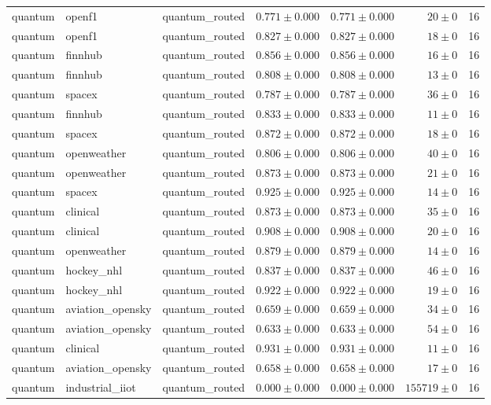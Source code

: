 \begin{table}[htbp]
\begin{tabular}{l l l r r r r}
quantum & openf1 & quantum\_routed & $0.771\pm0.000$ & $0.771\pm0.000$ & $20\pm0$ & 16 \\
quantum & openf1 & quantum\_routed & $0.827\pm0.000$ & $0.827\pm0.000$ & $18\pm0$ & 16 \\
quantum & finnhub & quantum\_routed & $0.856\pm0.000$ & $0.856\pm0.000$ & $16\pm0$ & 16 \\
quantum & finnhub & quantum\_routed & $0.808\pm0.000$ & $0.808\pm0.000$ & $13\pm0$ & 16 \\
quantum & spacex & quantum\_routed & $0.787\pm0.000$ & $0.787\pm0.000$ & $36\pm0$ & 16 \\
quantum & finnhub & quantum\_routed & $0.833\pm0.000$ & $0.833\pm0.000$ & $11\pm0$ & 16 \\
quantum & spacex & quantum\_routed & $0.872\pm0.000$ & $0.872\pm0.000$ & $18\pm0$ & 16 \\
quantum & openweather & quantum\_routed & $0.806\pm0.000$ & $0.806\pm0.000$ & $40\pm0$ & 16 \\
quantum & openweather & quantum\_routed & $0.873\pm0.000$ & $0.873\pm0.000$ & $21\pm0$ & 16 \\
quantum & spacex & quantum\_routed & $0.925\pm0.000$ & $0.925\pm0.000$ & $14\pm0$ & 16 \\
quantum & clinical & quantum\_routed & $0.873\pm0.000$ & $0.873\pm0.000$ & $35\pm0$ & 16 \\
quantum & clinical & quantum\_routed & $0.908\pm0.000$ & $0.908\pm0.000$ & $20\pm0$ & 16 \\
quantum & openweather & quantum\_routed & $0.879\pm0.000$ & $0.879\pm0.000$ & $14\pm0$ & 16 \\
quantum & hockey\_nhl & quantum\_routed & $0.837\pm0.000$ & $0.837\pm0.000$ & $46\pm0$ & 16 \\
quantum & hockey\_nhl & quantum\_routed & $0.922\pm0.000$ & $0.922\pm0.000$ & $19\pm0$ & 16 \\
quantum & aviation\_opensky & quantum\_routed & $0.659\pm0.000$ & $0.659\pm0.000$ & $34\pm0$ & 16 \\
quantum & aviation\_opensky & quantum\_routed & $0.633\pm0.000$ & $0.633\pm0.000$ & $54\pm0$ & 16 \\
quantum & clinical & quantum\_routed & $0.931\pm0.000$ & $0.931\pm0.000$ & $11\pm0$ & 16 \\
quantum & aviation\_opensky & quantum\_routed & $0.658\pm0.000$ & $0.658\pm0.000$ & $17\pm0$ & 16 \\
quantum & industrial\_iiot & quantum\_routed & $0.000\pm0.000$ & $0.000\pm0.000$ & $155719\pm0$ & 16 \\

\end{tabular}
\end{table}
